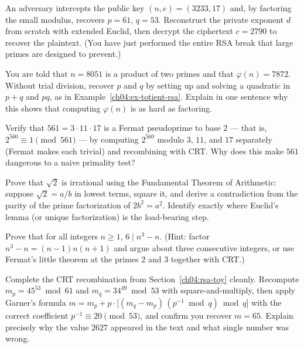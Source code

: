 \begin{exercise}
An adversary intercepts the public key $(n, e) = (3233, 17)$ and, by factoring the small modulus,
recovers $p = 61$, $q = 53$. Reconstruct the private exponent $d$ from scratch with extended Euclid,
then decrypt the ciphertext $c = 2790$ to recover the plaintext. (You have just performed the entire
RSA break that large primes are designed to prevent.)
\end{exercise}

\begin{exercise}
You are told that $n = 8051$ is a product of two primes and that $\varphi(n) = 7872$. Without
trial division, recover $p$ and $q$ by setting up and solving a quadratic in $p + q$ and $pq$, as in
Example~\ref{ch04:ex-totient-rsa}. Explain in one sentence why this shows that computing
$\varphi(n)$ is as hard as factoring.
\end{exercise}

\begin{exercise}
Verify that $561 = 3 \cdot 11 \cdot 17$ is a Fermat pseudoprime to base $2$ --- that is,
$2^{560} \equiv 1 \pmod{561}$ --- by computing $2^{560}$ modulo $3$, $11$, and $17$ separately
(Fermat makes each trivial) and recombining with CRT. Why does this make $561$ dangerous to a naive
primality test?
\end{exercise}

\begin{exercise}
Prove that $\sqrt{2}$ is irrational using the Fundamental Theorem of Arithmetic: suppose
$\sqrt 2 = a/b$ in lowest terms, square it, and derive a contradiction from the parity of the prime
factorization of $2b^2 = a^2$. Identify exactly where Euclid's lemma (or unique factorization) is
the load-bearing step.
\end{exercise}

\begin{exercise}
Prove that for all integers $n \ge 1$, $6 \mid n^3 - n$. (Hint: factor $n^3 - n = (n-1)n(n+1)$ and
argue about three consecutive integers, or use Fermat's little theorem at the primes $2$ and $3$
together with CRT.)
\end{exercise}

\begin{exercise}
Complete the CRT recombination from Section~\ref{ch04:rsa-toy} cleanly. Recompute
$m_p = 45^{53} \bmod 61$ and $m_q = 34^{49} \bmod 53$ with square-and-multiply, then apply Garner's
formula $m = m_p + p\cdot\big[(m_q - m_p)\,(p^{-1}\bmod q)\bmod q\big]$ with the correct coefficient
$p^{-1} \equiv 20 \pmod{53}$, and confirm you recover $m = 65$. Explain precisely why the value
$2627$ appeared in the text and what single number was wrong.
\end{exercise}
